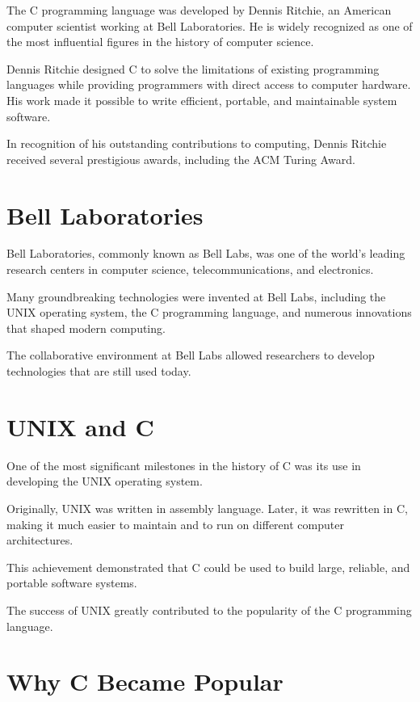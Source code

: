 \documentclass[12pt,openany]{book}
\begin{document}
The C programming language was developed by Dennis Ritchie, an American computer scientist working at Bell Laboratories. He is widely recognized as one of the most influential figures in the history of computer science.

Dennis Ritchie designed C to solve the limitations of existing programming languages while providing programmers with direct access to computer hardware. His work made it possible to write efficient, portable, and maintainable system software.

In recognition of his outstanding contributions to computing, Dennis Ritchie received several prestigious awards, including the ACM Turing Award.

\section{Bell Laboratories}

Bell Laboratories, commonly known as Bell Labs, was one of the world's leading research centers in computer science, telecommunications, and electronics.

Many groundbreaking technologies were invented at Bell Labs, including the UNIX operating system, the C programming language, and numerous innovations that shaped modern computing.

The collaborative environment at Bell Labs allowed researchers to develop technologies that are still used today.

\section{UNIX and C}

One of the most significant milestones in the history of C was its use in developing the UNIX operating system.

Originally, UNIX was written in assembly language. Later, it was rewritten in C, making it much easier to maintain and to run on different computer architectures.

This achievement demonstrated that C could be used to build large, reliable, and portable software systems.

The success of UNIX greatly contributed to the popularity of the C programming language.

\section{Why C Became Popular}
\end{document}
